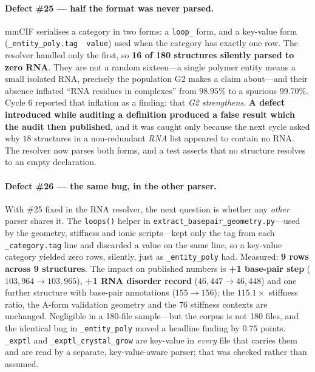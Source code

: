 \documentclass[11pt,a4paper]{article}
\begin{document}
\paragraph{Defect \#25 --- half the format was never parsed.} mmCIF serialises a
category in two forms: a \texttt{loop\_} form, and a key-value form
(\texttt{\_entity\_poly.tag\ \ value}) used when the category has exactly one
row. The resolver handled only the first, so \textbf{16 of 180 structures
silently parsed to zero RNA}. They are not a random sixteen---a single polymer
entity means a small isolated RNA, precisely the population G2 makes a claim
about---and their absence inflated ``RNA residues in complexes'' from $98.95\%$
to a spurious $99.70\%$. Cycle 6 reported that inflation as a finding: that
\emph{G2 strengthens}. \textbf{A defect introduced while auditing a definition
produced a false result which the audit then published}, and it was caught only
because the next cycle asked why $18$ structures in a non-redundant \emph{RNA}
list appeared to contain no RNA. The resolver now parses both forms, and a test
asserts that no structure resolves to an empty declaration.

\paragraph{Defect \#26 --- the same bug, in the other parser.} With \#25 fixed in
the RNA resolver, the next question is whether any \emph{other} parser shares it.
The \texttt{loops()} helper in
\texttt{extract\_basepair\_geometry.py}---used by the geometry, stiffness and
ionic scripts---kept only the tag from each \texttt{\_category.tag} line and
discarded a value on the same line, so a key-value category yielded zero rows,
silently, just as \texttt{\_entity\_poly} had. Measured: \textbf{9 rows across 9 structures}. The impact on published
numbers is \textbf{+1 base-pair step} ($103{,}964 \rightarrow 103{,}965$),
\textbf{+1 RNA disorder record} ($46{,}447 \rightarrow 46{,}448$) and one further
structure with base-pair annotations ($155 \rightarrow 156$); the $115.1\times$
stiffness ratio, the A-form validation geometry and the $76$ stiffness contexts
are unchanged. Negligible in a 180-file sample---but the corpus is not 180 files,
and the identical bug in \texttt{\_entity\_poly} moved a headline finding by
$0.75$ points. \texttt{\_exptl} and \texttt{\_exptl\_crystal\_grow} are key-value
in \emph{every} file that carries them and are read by a separate,
key-value-aware parser; that was checked rather than assumed.
\end{document}
